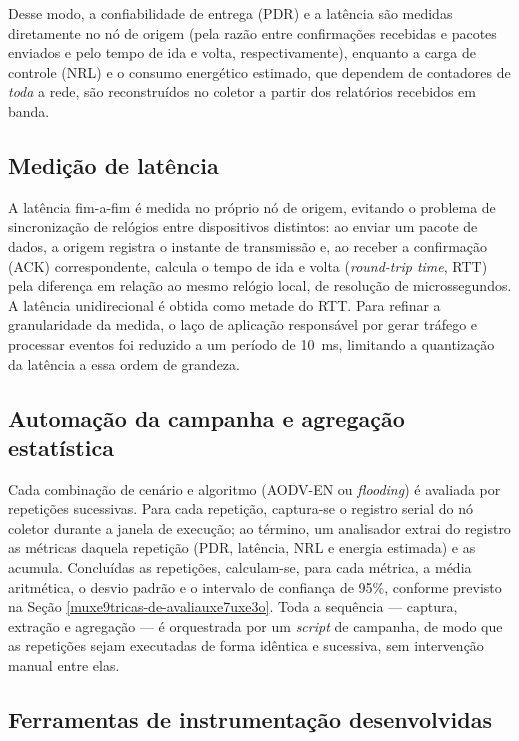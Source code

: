 Desse modo, a confiabilidade de entrega (PDR) e a latência são medidas
diretamente no nó de origem (pela razão entre confirmações recebidas e
pacotes enviados e pelo tempo de ida e volta, respectivamente), enquanto
a carga de controle (NRL) e o consumo energético estimado, que dependem
de contadores de \emph{toda} a rede, são reconstruídos no coletor a
partir dos relatórios recebidos em banda.

\subsection{Medição de latência}\label{medicao-de-latencia}

A latência fim-a-fim é medida no próprio nó de origem, evitando o
problema de sincronização de relógios entre dispositivos distintos: ao
enviar um pacote de dados, a origem registra o instante de transmissão
e, ao receber a confirmação (ACK) correspondente, calcula o tempo de ida
e volta (\emph{round-trip time}, RTT) pela diferença em relação ao mesmo
relógio local, de resolução de microssegundos. A latência unidirecional
é obtida como metade do RTT. Para refinar a granularidade da medida, o
laço de aplicação responsável por gerar tráfego e processar eventos foi
reduzido a um período de 10~ms, limitando a quantização da latência a
essa ordem de grandeza.

\subsection{Automação da campanha e agregação estatística}\label{automacao-campanha}

Cada combinação de cenário e algoritmo (AODV-EN ou \emph{flooding}) é
avaliada por repetições sucessivas. Para cada repetição, captura-se o
registro serial do nó coletor durante a janela de execução; ao término,
um analisador extrai do registro as métricas daquela repetição (PDR,
latência, NRL e energia estimada) e as acumula. Concluídas as
repetições, calculam-se, para cada métrica, a média aritmética, o desvio
padrão e o intervalo de confiança de 95\%, conforme previsto na Seção
\ref{muxe9tricas-de-avaliauxe7uxe3o}. Toda a sequência --- captura,
extração e agregação --- é orquestrada por um \emph{script} de campanha,
de modo que as repetições sejam executadas de forma idêntica e
sucessiva, sem intervenção manual entre elas.

\subsection{Ferramentas de instrumentação desenvolvidas}\label{ferramentas-instrumentacao}

